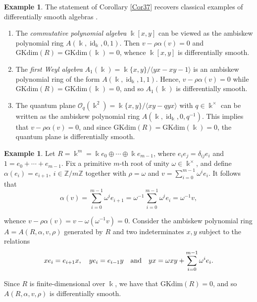 \documentclass{amsart}
\theoremstyle{definition}
\newtheorem{example}[theorem]{Example}
\theoremstyle{remark}
\numberwithin{equation}{section}
\begin{document}
\begin{example}\label{Example38}
The statement of Corollary \ref{Cor37} recovers classical examples of differentially smooth algebras \cite[Lemma 3.1 (1)(a) and Proposition 3.3]{Brzezinski2015}.
\begin{enumerate}
\item[\rm (i)] The {\em commutative polynomial algebra} $\Bbbk[x,y]$ can be viewed as the ambiskew polynomial ring $A(\Bbbk,\operatorname{id}_{\Bbbk},0,1)$. Then $ v-\rho\alpha(v) = 0$ and $\mathrm{GKdim}(R)=\mathrm{GKdim}(\Bbbk)=0$, whence $\Bbbk[x,y]$ is differentially smooth.

\item[\rm (ii)] The {\em first Weyl algebra} $ A_1(\Bbbk) = \Bbbk\{x, y\} /\langle yx - xy - 1\rangle$ is an ambiskew polynomial ring of the form $ A(\Bbbk,\operatorname{id}_{\Bbbk},1,1)$. Hence, $v-\rho\alpha(v) = 0$ while $ \mathrm{GKdim}(R)=\mathrm{GKdim}(\Bbbk) = 0$, and so $A_1(\Bbbk)$ is differentially smooth. 

\item[\rm (iii)] The quantum plane $\mathcal{O}_q(\Bbbk^2) = \Bbbk\{x, y\} / \langle xy - qyx\rangle$ with $q\in \Bbbk^\times$ can be written as the ambiskew polynomial ring $  A(\Bbbk,\operatorname{id}_{\Bbbk},0,q^{-1})$. This implies that $v - \rho\alpha(v) = 0$, and since $\mathrm{GKdim}(R) = \mathrm{GKdim}(\Bbbk) = 0$, the quantum plane is differentially smooth.
\end{enumerate}
\end{example}

\begin{example}\label{Exsemsimple}
Let $R = \Bbbk^m=\Bbbk e_0\oplus \cdots \oplus \Bbbk e_{m-1}$, where $e_i e_j = \delta_{ij}e_i$ and $1 = e_0+\cdots+e_{m-1}$. Fix a primitive $m$-th root of unity $\omega\in \Bbbk^\times$, and define $\alpha(e_i)=e_{i+1}, \ i\in \mathbb{Z}/m\mathbb{Z}$ together with $\rho=\omega$ and $v = \sum_{i=0}^{m-1}\omega^i e_i$. It follows that
\[
\alpha(v)=\sum_{i=0}^{m-1}\omega^i e_{i+1} =\omega^{-1}\sum_{i=0}^{m-1}\omega^i e_i =\omega^{-1}v,
\]

whence $v-\rho\alpha(v)=v-\omega(\omega^{-1}v)=0$. 
Consider the ambiskew polynomial ring $A=A(R,\alpha,v,\rho)$ generated by $R$ and two indeterminates $x,y$ subject to the relations 
\[
xe_i = e_{i+1}x, \quad ye_i = e_{i-1}y \quad {\rm and} \quad yx = \omega xy+\sum_{i=0}^{m-1}\omega^i e_i.
\]

Since $R$ is finite-dimensional over $\Bbbk$, we have that $\mathrm{GKdim}(R)=0$, and so $A(R,\alpha,v,\rho)$ is differentially smooth.
\end{example}
\end{document}

